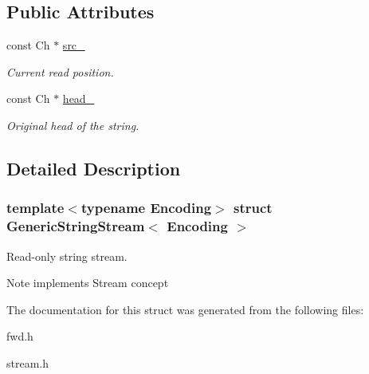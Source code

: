 \subsection*{Public Attributes}
\begin{DoxyCompactItemize}
\item 
\mbox{\label{a02200_aeda813798e3f2d6bfdac86afc11b6b80}} 
const Ch $\ast$ \hyperlink{a02200_aeda813798e3f2d6bfdac86afc11b6b80}{src\+\_\+}
\begin{DoxyCompactList}\small\item\em Current read position. \end{DoxyCompactList}\item 
\mbox{\label{a02200_a3c86ef1e1f0655028cb8a3afce11ee4f}} 
const Ch $\ast$ \hyperlink{a02200_a3c86ef1e1f0655028cb8a3afce11ee4f}{head\+\_\+}
\begin{DoxyCompactList}\small\item\em Original head of the string. \end{DoxyCompactList}\end{DoxyCompactItemize}


\subsection{Detailed Description}
\subsubsection*{template$<$typename Encoding$>$\newline
struct Generic\+String\+Stream$<$ Encoding $>$}

Read-\/only string stream. 

\begin{DoxyNote}{Note}
implements Stream concept 
\end{DoxyNote}


The documentation for this struct was generated from the following files\+:\begin{DoxyCompactItemize}
\item 
fwd.\+h\item 
stream.\+h\end{DoxyCompactItemize}
